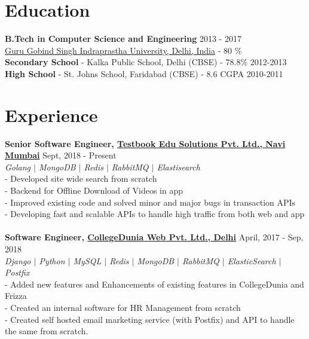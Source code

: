 \documentclass[margin, centered]{res}
\begin{document}
\begin{resume}

\section{Education}
\textbf{B.Tech in Computer Science and Engineering} \hfill 2013 - 2017 \textbf \\
\href{http://ipu.ac.in/}{Guru Gobind Singh Indraprastha University, Delhi, India} - {80 \%} \\ 
\textbf{Secondary School} - Kalka Public School, Delhi (CBSE) - 78.8\% \hfill 2012-2013\\
\textbf{High School} - St. Johns School, Faridabad (CBSE) - 8.6 CGPA \hfill 2010-2011
 
\section{Experience}
\textbf{Senior Software Engineer, \href{https://testbook.com}{Testbook Edu Solutions Pvt. Ltd., Navi Mumbai}} \hfill Sept, 2018 - Present\\
\emph{\color{BlueViolet}Golang $\vert$ MongoDB $\vert$ Redis $\vert$ RabbitMQ $\vert$ Elastisearch} \\
- Developed site wide search from scratch\\
- Backend for Offline Download of Videos in app \\
- Improved existing code and solved minor and major bugs in transaction APIs \\
- Developing fast and scalable APIs to handle high traffic from both web and app\\
\\
\textbf{Software Engineer, \href{https://collegedunia.com}{CollegeDunia Web Pvt. Ltd., Delhi}} \hfill April, 2017 - Sep, 2018\\
\emph{\color{BlueViolet}Django $\vert$ Python $\vert$ MySQL $\vert$ Redis $\vert$ MongoDB $\vert$ RabbitMQ $\vert$ ElasticSearch $\vert$ Postfix } \\
- Added new features and Enhancements of existing features in CollegeDunia and Frizza\\
- Created an internal software for HR Management from scratch\\
- Created self hosted email marketing service (with Postfix) and API to handle the same from scratch.\\


\end{resume}
\end{document}

